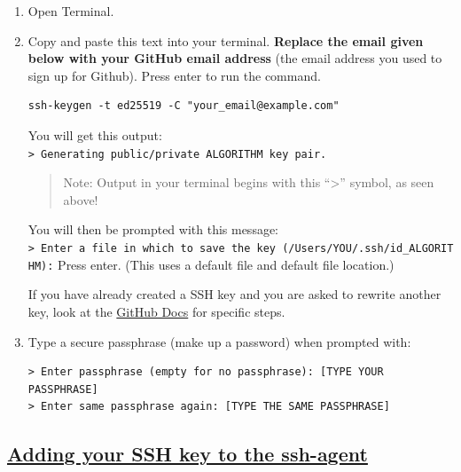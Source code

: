 \documentclass[
]{book}
\theoremstyle{definition}
\theoremstyle{definition}
\theoremstyle{definition}
\theoremstyle{definition}
\theoremstyle{remark}
\begin{document}
\begin{enumerate}
\def\labelenumi{\arabic{enumi}.}
\item
  Open Terminal.
\item
  Copy and paste this text into your terminal. \textbf{Replace the email given below with your GitHub email address} (the email address you used to sign up for Github). Press enter to run the command.

\begin{verbatim}
ssh-keygen -t ed25519 -C "your_email@example.com"
\end{verbatim}

  You will get this output:
  \texttt{\textgreater{}\ Generating\ public/private\ ALGORITHM\ key\ pair.}

  \begin{quote}
  Note: Output in your terminal begins with this ``\textgreater{}'' symbol, as seen above!
  \end{quote}

  You will then be prompted with this message:
  \texttt{\textgreater{}\ Enter\ a\ file\ in\ which\ to\ save\ the\ key\ (/Users/YOU/.ssh/id\_ALGORITHM):}
  Press enter. (This uses a default file and default file location.)

  If you have already created a SSH key and you are asked to rewrite another key, look at the \href{https://docs.github.com/en/authentication/connecting-to-github-with-ssh/generating-a-new-ssh-key-and-adding-it-to-the-ssh-agent\#generating-a-new-ssh-key:~:text=Please\%20note\%20that\%20if\%20you\%20created\%20SSH\%20keys\%20previously\%2C\%20ssh\%2Dkeygen\%20may\%20ask\%20you\%20to\%20rewrite\%20another\%20key\%2C\%20in\%20which\%20case\%20we\%20recommend\%20creating\%20a\%20custom\%2Dnamed\%20SSH\%20key.\%20To\%20do\%20so\%2C\%20type\%20the\%20default\%20file\%20location\%20and\%20replace\%20id_ALGORITHM\%20with\%20your\%20custom\%20key\%20name.}{GitHub Docs} for specific steps.
\item
  Type a secure passphrase (make up a password) when prompted with:

\begin{verbatim}
> Enter passphrase (empty for no passphrase): [TYPE YOUR PASSPHRASE]
> Enter same passphrase again: [TYPE THE SAME PASSPHRASE]
\end{verbatim}
\end{enumerate}

\subsection{\texorpdfstring{\href{https://docs.github.com/en/authentication/connecting-to-github-with-ssh/generating-a-new-ssh-key-and-adding-it-to-the-ssh-agent\#adding-your-ssh-key-to-the-ssh-agent}{Adding your SSH key to the ssh-agent}}{Adding your SSH key to the ssh-agent}}\label{adding-your-ssh-key-to-the-ssh-agent}
\end{document}
